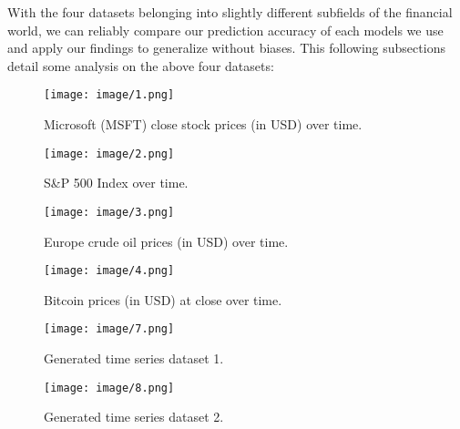 \documentclass[letterpaper, 10 pt, conference]{ieeeconf}  %
\begin{document}
        With the four datasets belonging into slightly different subfields of the financial world, we can reliably compare our prediction accuracy of each models we use and apply our findings to generalize without biases. This following subsections detail some analysis on the above four datasets:
        \begin{figure*}
            \centering
            \begin{minipage}[b]{.4\textwidth}
                \centering
                \texttt{[image: image/1.png]}
                \caption{Microsoft (MSFT) close stock prices (in USD) over time.}\label{fig:sub1}
            \end{minipage}\qquad
            \begin{minipage}[b]{.4\textwidth}
                \centering
                \texttt{[image: image/2.png]}
                \caption{S\&P 500 Index over time.}\label{fig:sub2}
            \end{minipage}
        \end{figure*}

        \begin{figure*}
            \centering
            \begin{minipage}[b]{.4\textwidth}
                \centering
                \texttt{[image: image/3.png]}
                \caption{Europe crude oil prices (in USD) over time.}\label{fig:sub3}
            \end{minipage}\qquad
            \begin{minipage}[b]{.4\textwidth}
                \centering
                \texttt{[image: image/4.png]}
                \caption{Bitcoin prices (in USD) at close over time.}\label{fig:sub4}
            \end{minipage}

        \end{figure*}

        \begin{figure*}
            \centering
            \begin{minipage}[b]{.4\textwidth}
                \centering
                \texttt{[image: image/7.png]}
                \caption{Generated time series dataset 1.}\label{fig:sub5}
            \end{minipage}\qquad
            \begin{minipage}[b]{.4\textwidth}
                \centering
                \texttt{[image: image/8.png]}
                \caption{Generated time series dataset 2.}\label{fig:sub6}
            \end{minipage}
        \end{figure*}
\end{document}
